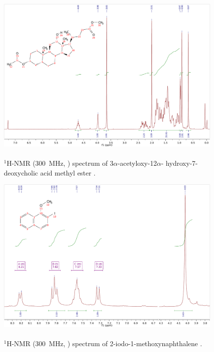 \ifpdf
\begin{figure}%
 \centering
 \includegraphics[width=1\textwidth]{sp/amda-crop.pdf}
  \caption{\\$^1$H-NMR (300~MHz, ) spectrum of 3$\alpha$-acetyloxy-12$\alpha$-
hydroxy-7-deoxy\-cholic acid methyl ester . \label{sp:amda}}
\end{figure}
\else
\fignoeps
\fi

\ifpdf
\begin{figure}%
 \centering
 \includegraphics[width=1\textwidth]{sp/moni-crop.pdf}
  \caption{\\$^1$H-NMR (300~MHz, ) spectrum of 2-iodo-1-methoxy\-naphthalene . \label{sp:moni}}
\end{figure}
\else
\fignoeps
\fi



